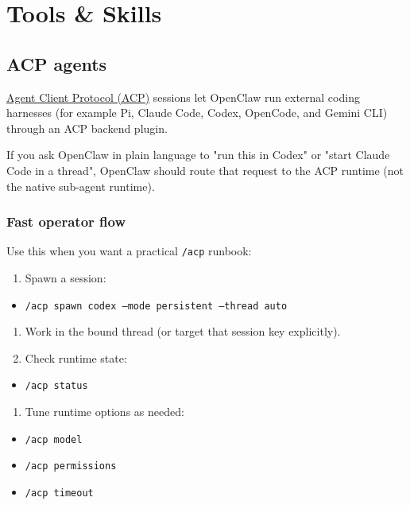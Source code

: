 \chapter{Tools \& Skills}

\section{ACP agents}


\href{https://agentclientprotocol.com/}{Agent Client Protocol (ACP)} sessions let OpenClaw run external coding harnesses (for example Pi, Claude Code, Codex, OpenCode, and Gemini CLI) through an ACP backend plugin.

If you ask OpenClaw in plain language to "run this in Codex" or "start Claude Code in a thread", OpenClaw should route that request to the ACP runtime (not the native sub-agent runtime).

\subsection{Fast operator flow}


Use this when you want a practical \texttt{/acp} runbook:

\begin{enumerate}
  \item Spawn a session:
\end{enumerate}

\begin{itemize}
  \item \texttt{/acp spawn codex --mode persistent --thread auto}
\end{itemize}

\begin{enumerate}
  \item Work in the bound thread (or target that session key explicitly).
  \item Check runtime state:
\end{enumerate}

\begin{itemize}
  \item \texttt{/acp status}
\end{itemize}

\begin{enumerate}
  \item Tune runtime options as needed:
\end{enumerate}

\begin{itemize}
  \item \texttt{/acp model }
  \item \texttt{/acp permissions }
  \item \texttt{/acp timeout }
\end{itemize}

